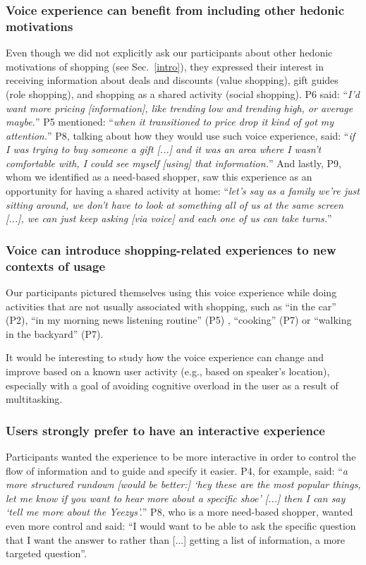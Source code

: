 \subsubsection{\textbf{Voice experience can benefit from including other hedonic motivations}} Even though we did not explicitly ask our participants about other hedonic motivations of shopping (see Sec.~\ref{intro}), they expressed their interest in receiving information about deals and discounts (value shopping), gift guides (role shopping), and shopping as a shared activity (social shopping). P6 said: ``\textit{I'd want more pricing [information], like trending low and trending high, or average maybe.}'' P5 mentioned: ``\textit{when it transitioned to price drop it kind of got my attention.}'' P8, talking about how they would use such voice experience, said: ``\textit{if I was trying to buy someone a gift [...] and it was an area where I wasn't comfortable with, I could see myself [using] that information.}'' And lastly, P9, whom we identified as a need-based shopper, saw this experience as an opportunity for having a shared activity at home: ``\textit{let's say as a family we're just sitting around, we don't have to look at something all of us at the same screen [...], we can just keep asking [via voice] and each one of us can take turns.}''

\subsubsection{\textbf{Voice can introduce shopping-related experiences to new contexts of usage}} Our participants pictured themselves using this voice experience while doing activities that are not usually associated with shopping, such as ``in the car'' (P2), ``in my morning news listening routine'' (P5) , ``cooking'' (P7) or ``walking in the backyard'' (P7). 

It would be interesting to study how the voice experience can change and improve based on a known user activity (e.g., based on speaker's location), especially with a goal of avoiding cognitive overload in the user as a result of multitasking.

\subsubsection{\textbf{Users strongly prefer to have an interactive experience}} Participants wanted the experience to be more interactive in order to control the flow of information and to guide and specify it easier. P4, for example, said: ``\textit{a more structured rundown [would be better:] `hey these are the most popular things, let me know if you want to hear more about a specific shoe' [...] then I can say `tell me more about the Yeezys'.}'' P8, who is a more need-based shopper, wanted even more control and said: ``I would want to be able to ask the specific question that I want the answer to rather than [...] getting a list of information, a more targeted question''. 

